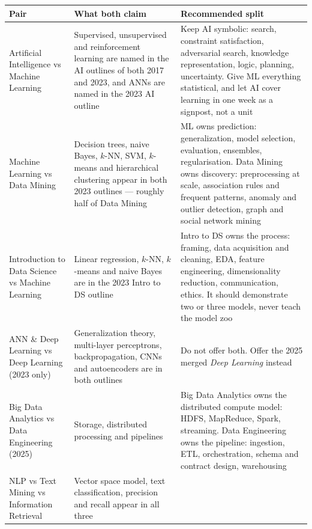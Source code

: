 \documentclass[11pt,a4paper,oneside]{report}
\begin{document}
\begin{longtable}{@{}L{4.4cm}L{5.2cm}L{6.0cm}@{}}
\toprule
{}
\textbf{Pair} & \textbf{What both claim} & \textbf{Recommended split} \\
\midrule
\endhead
Artificial Intelligence \newline vs Machine Learning &
Supervised, unsupervised and reinforcement learning are named in the AI outlines
of both 2017 and 2023, and ANNs are named in the 2023 AI outline &
Keep AI symbolic: search, constraint satisfaction, adversarial search, knowledge
representation, logic, planning, uncertainty. Give ML everything statistical, and
let AI cover learning in one week as a signpost, not a unit \\
Machine Learning \newline vs Data Mining &
Decision trees, naive Bayes, $k$-NN, SVM, $k$-means and hierarchical clustering
appear in both 2023 outlines --- roughly half of Data Mining &
ML owns prediction: generalization, model selection, evaluation, ensembles,
regularisation. Data Mining owns discovery: preprocessing at scale, association
rules and frequent patterns, anomaly and outlier detection, graph and social
network mining \\
Introduction to Data Science \newline vs Machine Learning &
Linear regression, $k$-NN, $k$-means and naive Bayes are in the 2023 Intro to DS
outline &
Intro to DS owns the process: framing, data acquisition and cleaning, EDA,
feature engineering, dimensionality reduction, communication, ethics. It should
demonstrate two or three models, never teach the model zoo \\
ANN \& Deep Learning \newline vs Deep Learning (2023 only) &
Generalization theory, multi-layer perceptrons, backpropagation, CNNs and
autoencoders are in both outlines &
Do not offer both. Offer the 2025 merged \emph{Deep Learning} instead \\
Big Data Analytics \newline vs Data Engineering (2025) &
Storage, distributed processing and pipelines &
Big Data Analytics owns the distributed compute model: HDFS, MapReduce, Spark,
streaming. Data Engineering owns the pipeline: ingestion, ETL, orchestration,
schema and contract design, warehousing \\
NLP vs Text Mining \newline vs Information Retrieval &
Vector space model, text classification, precision and recall appear in all three &

\end{longtable}
\end{document}
